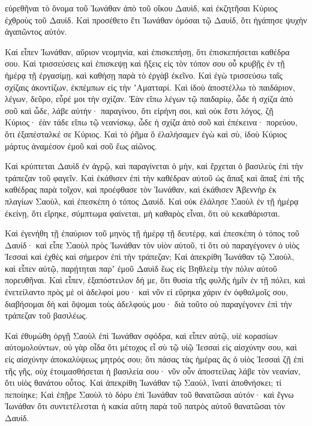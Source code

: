{εὑρεθῆναι τὸ ὄνομα τοῦ Ἰωνάθαν ἀπὸ τοῦ οἴκου Δαυὶδ, καὶ ἐκζητῆσαι Κύριος ἐχθροὺς τοῦ Δαυίδ.
Καὶ προσέθετο ἔτι Ἰωνάθαν ὀμόσαι τῷ Δαυίδ, ὅτι ἠγάπησε ψυχὴν ἀγαπῶντος αὐτόν.
\par }{\PP {}Καὶ εἶπεν Ἰωνάθαν, αὔριον νεομηνία, καὶ ἐπισκεπήσῃ, ὅτι ἐπισκεπήσεται καθέδρα σου.
Καὶ τρισσεύσεις καὶ ἐπισκεψῃ καὶ ἥξεις εἰς τὸν τόπον σου οὗ κρυβῇς ἐν τῇ ἡμέρᾳ τῇ ἐργασίμῃ, καὶ καθήσῃ παρὰ τὸ ἐργὰβ ἐκεῖνο.
Καὶ ἐγὼ τρισσεύσω ταῖς σχίζαις ἀκοντίζων, ἐκπέμπων εἰς τὴν ʼΑματταρί.
Καὶ ἰδοὺ ἀποστέλλω τὸ παιδάριον, λέγων, δεῦρο, εὗρέ μοι τὴν σχίζαν. Ἐὰν εἴπω λέγων τῷ παιδαρίῳ, ὧδε ἡ σχίζα ἀπὸ σοῦ καὶ ὧδε, λάβε αὐτήν· παραγίνου, ὅτι εἰρήνη σοι, καὶ οὐκ ἔστι λόγος, ζῇ Κύριος·
ἐὰν τάδε εἴπω τῷ νεανίσκῳ, ὧδε ἡ σχίζα ἀπὸ σοῦ καὶ ἐπέκεινα· πορεύου, ὅτι ἐξαπέσταλκέ σε Κύριος.
Καὶ τὸ ῥῆμα ὃ ἐλαλήσαμεν ἐγὼ καὶ σὺ, ἰδοὺ Κύριος μάρτυς ἀναμέσον ἐμοῦ καὶ σοῦ ἕως αἰῶνος.
\par }{\PP {}Καὶ κρύπτεται Δαυὶδ ἐν ἀγρῷ, καὶ παραγίνεται ὁ μὴν, καὶ ἔρχεται ὁ βασιλεὺς ἐπὶ τὴν τράπεζαν τοῦ φαγεῖν.
Καὶ ἐκάθισεν ἐπὶ τὴν καθέδραν αὐτοῦ ὡς ἅπαξ καὶ ἅπαξ ἐπὶ τῆς καθέδρας παρὰ τοῖχον, καὶ προέφθασε τὸν Ἰωνάθαν, καὶ ἐκάθισεν Ἀβεννὴρ ἐκ πλαγίων Σαοὺλ, καὶ ἐπεσκέπη ὁ τόπος Δαυίδ.
Καὶ οὐκ ἐλάλησε Σαοὺλ ἐν τῇ ἡμέρᾳ ἐκείνῃ, ὅτι εἴρηκε, σύμπτωμα φαίνεται, μὴ καθαρὸς εἶναι, ὅτι οὐ κεκαθάρισται.
\par }{\PP {}Καὶ ἐγενήθη τῇ ἐπαύριον τοῦ μηνὸς τῇ ἡμέρᾳ τῇ δευτέρᾳ, καὶ ἐπεσκέπη ὁ τόπος τοῦ Δαυίδ· καὶ εἶπε Σαοὺλ πρὸς Ἰωνάθαν τὸν υἱὸν αὐτοῦ, τί ὅτι οὐ παραγέγονεν ὁ υἱὸς Ἰεσσαὶ καὶ ἐχθὲς καὶ σήμερον ἐπὶ τὴν τράπεζαν;
Καὶ ἀπεκρίθη Ἰωνάθαν τῷ Σαοὺλ, καὶ εἶπεν αὐτῷ, παρῄτηται παρʼ ἐμοῦ Δαυὶδ ἕως εἰς Βηθλεὲμ τὴν πόλιν αὐτοῦ πορευθῆναι.
Καὶ εἶπεν, ἐξαπόστειλον δή με, ὅτι θυσία τῆς φυλῆς ἡμῖν ἐν τῇ πόλει, καὶ ἐνετείλαντο πρὸς μὲ οἱ ἀδελφοί μου· καὶ νῦν εἰ εὕρηκα χάριν ἐν ὀφθαλμοῖς σου, διαβήσομαι δὴ καὶ ὄψομαι τοὺς ἀδελφούς μου· διὰ τοῦτο οὐ παραγέγονεν ἐπὶ τὴν τράπεζαν τοῦ βασιλέως.
\par }{\PP {}Καὶ ἐθυμώθη ὀργῇ Σαοὺλ ἐπὶ Ἰωνάθαν σφόδρα, καὶ εἶπεν αὐτῷ, υἱὲ κορασίων αὐτομολούντων, οὐ γὰρ οἶδα ὅτι μέτοχος εἶ σὺ τῷ υἱῷ Ἰεσσαὶ εἰς αἰσχύνην σου, καὶ εἰς αἰσχύνην ἀποκαλύψεως μητρός σου;
ὅτι πάσας τὰς ἡμέρας ἃς ὁ υἱὸς Ἰεσσαὶ ζῇ ἐπὶ τῆς γῆς, οὐχ ἑτοιμασθήσεται ἡ βασιλεία σου· νῦν οὖν ἀποστείλας λάβε τὸν νεανίαν, ὅτι υἱὸς θανάτου οὗτος.
Καὶ ἀπεκρίθη Ἰωνάθαν τῷ Σαοὺλ, ἵνατί ἀποθνήσκει; τί πεποίηκε;
Καὶ ἐπῇρε Σαοὺλ τὸ δόρυ ἐπὶ Ἰωνάθαν τοῦ θανατῶσαι αὐτόν· καὶ ἔγνω Ἰωνάθαν ὅτι συντετέλεσται ἡ κακία αὕτη παρὰ τοῦ πατρὸς αὐτοῦ θανατῶσαι τὸν Δαυίδ.
}
